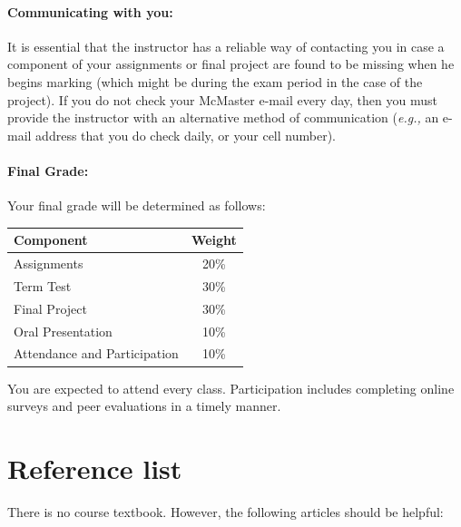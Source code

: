 \documentclass[12pt]{article}
\begin{document}
\paragraph*{Communicating with you:}

It is essential that the instructor has a reliable way of contacting you in case a component of your assignments or final project are found to be missing when he begins marking (which might be during the exam period in the case of the project).  If you do not check your McMaster e-mail every day, then you must provide the instructor with an alternative method of communication (\emph{e.g.,} an e-mail address that you do check daily, or your cell number).

\paragraph*{Final Grade:}
Your final grade will be determined as follows:
%
\begin{center}
\begin{tabular}{l|c}
\bf Component & \bf Weight \\\hline
Assignments & 20\% \\
Term Test & 30\% \\
Final Project & 30\% \\
Oral Presentation & 10\% \\
Attendance and Participation & 10\% \\
\end{tabular}
\end{center}
\noindent You are expected to attend every class.  Participation
includes completing online surveys and peer evaluations in a timely
manner.

\section*{Reference list}
There is no course textbook.  However, the following articles should be helpful:
\end{document}
